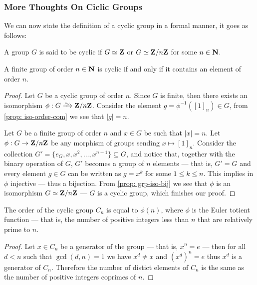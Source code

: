 \subsubsection{More Thoughts On Ciclic Groups}

We can now state the definition of a cyclic group in a formal manner, it goes as
follows:

\begin{definition}\label{def: cyclic-grp}
  A group \(G\) is said to be cyclic if \(G \simeq \mathbf{Z}\) or \(G \simeq \mathbf{Z}/n\mathbf{Z}\) for
  some \(n \in \mathbf{N}\).
\end{definition}

\begin{proposition}
  A finite group of order \(n \in \mathbf{N}\) is cyclic if and only if it contains an
  element of order \(n\).
\end{proposition}

\begin{proof}
  Let \(G\) be a cyclic group of order \(n\). Since \(G\) is finite, then there
  exists an isomorphism \(\phi: G \isoto \Z/n\Z\). Consider the element \(g =
  \phi^{-1}([1]_n) \in G\), from \cref{prop: iso-order-com} we see that \(|g| =
  n\).

  Let \(G\) be a finite group of order \(n\) and \(x \in G\) be such that \(|x|
  = n\). Let \(\phi: G \to \mathbf{Z}/n\mathbf{Z}\) be any morphism of groups sending \(x
  \mapsto [1]_n\). Consider the collection \(G' = \{e_G, x, x^2, \dots,
  x^{n-1}\} \subseteq G\), and notice that, together with the binary operation
  of \(G\), \(G'\) becomes a group of \(n\) elements --- that is, \(G' = G\) and
  every element \(g \in G\) can be written as \(g = x^k\) for some \(1 \leq k
  \leq n\). This implies in \(\phi\) injective --- thus a bijection. From
  \cref{prop: grp-iso-bij} we see that \(\phi\) is an isomorphism \(G \simeq
  \mathbf{Z}/n\mathbf{Z}\) --- \(G\) is a cyclic group, which finishes our proof.
\end{proof}

\begin{proposition}
  \label{prop:order-cyclic-totient}
  The order of the cyclic group \(C_n\) is equal to \(\phi(n)\), where \(\phi\) is the
  Euler totient function --- that is, the number of positive integers less than
  \(n\) that are relatively prime to \(n\).
\end{proposition}

\begin{proof}
  Let \(x \in C_n\) be a generator of the group --- that is, \(x^n = e\) --- then
  for all \(d < n\) such that \(\gcd(d, n) = 1\) we have \(x^d \neq x\) and
  \((x^d)^n = e\) thus \(x^d\) is a generator of \(C_n\). Therefore the number
  of distict elements of \(C_n\) is the same as the number of positive integers
  coprimes of \(n\).
\end{proof}

